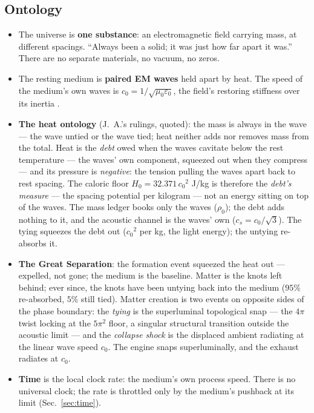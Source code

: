 \documentclass[11pt, a4paper]{article}
\newcommand{\cnot}{\ensuremath{c_0}}
\newcommand{\rhonot}{\ensuremath{\rho_0}}
\newcommand{\Hnot}{\ensuremath{H_0}}
\begin{document}
\subsection{Ontology}
\begin{itemize}
\item The universe is \textbf{one substance}: an electromagnetic field carrying
mass, at different spacings. ``Always been a solid; it was just how far apart it
was.'' There are no separate materials, no vacuum, no zeros.
\item The resting medium is \textbf{paired EM waves} held apart by heat. The speed
of the medium's own waves is $\cnot = 1/\sqrt{\mu_0\varepsilon_0}$, the field's
restoring stiffness over its inertia \cite{maxwell1865}.
\item \textbf{The heat ontology} (J.~A.'s rulings, quoted): the mass is always in
the wave --- the wave untied or the wave tied; heat neither adds nor removes mass
from the total. Heat is the \emph{debt} owed when the waves cavitate below the
rest temperature --- the waves' own component, squeezed out when they compress ---
and its pressure is \emph{negative}: the tension pulling the waves apart back to
rest spacing. The caloric floor $\Hnot = 32.371\,\cnot^2$ J/kg is therefore the
\emph{debt's measure} --- the spacing potential per kilogram --- not an energy
sitting on top of the waves. The mass ledger books only the waves ($\rhonot$);
the debt adds nothing to it, and the acoustic channel is the waves' own
($c_s = \cnot/\sqrt3$). The tying squeezes the debt out ($\cnot^2$ per kg, the
light energy); the untying re-absorbs it.
\item \textbf{The Great Separation}: the formation event squeezed the heat out ---
expelled, not gone; the medium is the baseline. Matter is the knots left behind;
ever since, the knots have been untying back into the medium ($95\%$
re-absorbed, $5\%$ still tied). Matter creation is two events on opposite sides
of the phase boundary: the \emph{tying} is the superluminal topological snap ---
the $4\pi$ twist locking at the $5\pi^2$ floor, a singular structural transition
outside the acoustic limit --- and the \emph{collapse shock} is the displaced
ambient radiating at the linear wave speed $\cnot$. The engine snaps
superluminally, and the exhaust radiates at $\cnot$.
\item \textbf{Time} is the local clock rate: the medium's own process speed. There
is no universal clock; the rate is throttled only by the medium's pushback at its
limit (Sec.~\ref{sec:time}).
\end{itemize}
\end{document}
